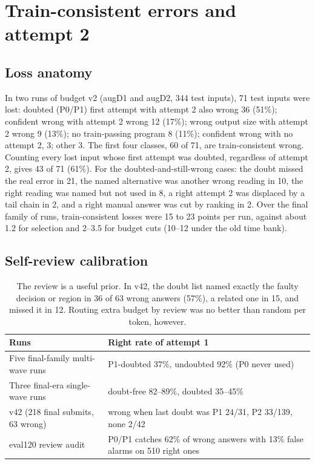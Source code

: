 \section{Train-consistent errors and attempt 2}\label{app:tcw}

\subsection{Loss anatomy}
In two runs of budget v2 (augD1 and augD2, 344 test inputs), 71 test inputs were lost: doubted (P0/P1) first attempt with attempt 2 also wrong 36 (51\%); confident wrong with attempt 2 wrong 12 (17\%); wrong output size with attempt 2 wrong 9 (13\%); no train-passing program 8 (11\%); confident wrong with no attempt 2, 3; other 3. The first four classes, 60 of 71, are train-consistent wrong. Counting every lost input whose first attempt was doubted, regardless of attempt 2, gives 43 of 71 (61\%). For the doubted-and-still-wrong cases: the doubt missed the real error in 21, the named alternative was another wrong reading in 10, the right reading was named but not used in 8, a right attempt 2 was displaced by a tail chain in 2, and a right manual answer was cut by ranking in 2. Over the final family of runs, train-consistent losses were 15 to 23 points per run, against about 1.2 for selection and 2--3.5 for budget cuts (10--12 under the old time bank).

\subsection{Self-review calibration}
\begin{table}[H]\centering\small
\begin{tabularx}{\linewidth}{@{}>{\raggedright\arraybackslash}X>{\raggedright\arraybackslash}X@{}}
\toprule
Runs & Right rate of attempt 1 \\
\midrule
Five final-family multi-wave runs & P1-doubted 37\%, undoubted 92\% (P0 never used) \\
Three final-era single-wave runs & doubt-free 82--89\%, doubted 35--45\% \\
v42 (218 final submits, 63 wrong) & wrong when last doubt was P1 24/31, P2 33/139, none 2/42 \\
eval120 review audit & P0/P1 catches 62\% of wrong answers with 13\% false alarms on 510 right ones \\
\bottomrule
\end{tabularx}
\caption{The review is a useful prior. In v42, the doubt list named exactly the faulty decision or region in 36 of 63 wrong answers (57\%), a related one in 15, and missed it in 12. Routing extra budget by review was no better than random per token, however.}
\end{table}

